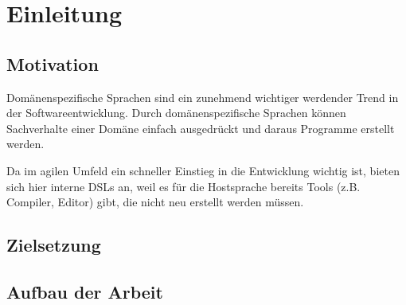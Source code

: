\documentclass[../InterneDSLs.tex]{subfiles}
\begin{document}
\chapter{Einleitung}


\section{Motivation}
Domänenspezifische Sprachen sind ein zunehmend wichtiger werdender Trend in der Softwareentwicklung. Durch domänenspezifische Sprachen können Sachverhalte einer Domäne einfach ausgedrückt und daraus Programme erstellt werden. 

Da im agilen Umfeld ein schneller Einstieg in die Entwicklung wichtig ist, bieten sich hier interne \acsp{DSL} an, weil es für die Hostsprache bereits Tools (z.B. Compiler, Editor) gibt, die nicht neu erstellt werden müssen.

\section{Zielsetzung}


\section{Aufbau der Arbeit}
\end{document}
